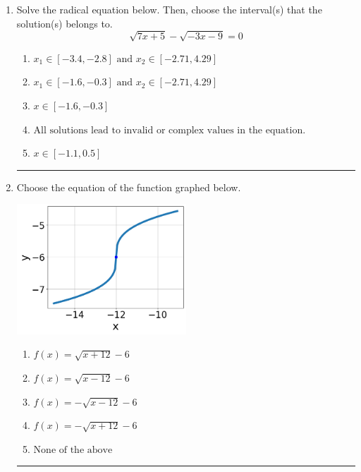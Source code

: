 \documentclass[14pt]{extbook}
\newcommand{\litem}[1]{\item#1\hspace*{-1cm}\rule{\textwidth}{0.4pt}}
\begin{document}
\begin{enumerate}
{\begin{enumerate}[label=\Alph*.]
\end{enumerate} }
\litem{
Solve the radical equation below. Then, choose the interval(s) that the solution(s) belongs to.\[ \sqrt{7 x + 5} - \sqrt{-3 x - 9} = 0 \]\begin{enumerate}[label=\Alph*.]
\item \( x_1 \in [-3.4, -2.8] \text{ and } x_2 \in [-2.71,4.29] \)
\item \( x_1 \in [-1.6, -0.3] \text{ and } x_2 \in [-2.71,4.29] \)
\item \( x \in [-1.6,-0.3] \)
\item \( \text{All solutions lead to invalid or complex values in the equation.} \)
\item \( x \in [-1.1,0.5] \)

\end{enumerate} }
\litem{
Choose the equation of the function graphed below.
\begin{center}
    \includegraphics[width=0.5\textwidth]{../Figures/radicalGraphToEquationB.png}
\end{center}
\begin{enumerate}[label=\Alph*.]
\item \( f(x) = \sqrt{x + 12} - 6 \)
\item \( f(x) = \sqrt{x - 12} - 6 \)
\item \( f(x) = - \sqrt{x - 12} - 6 \)
\item \( f(x) = - \sqrt{x + 12} - 6 \)
\item \( \text{None of the above} \)


\end{enumerate}}
\end{enumerate}
\end{document}
